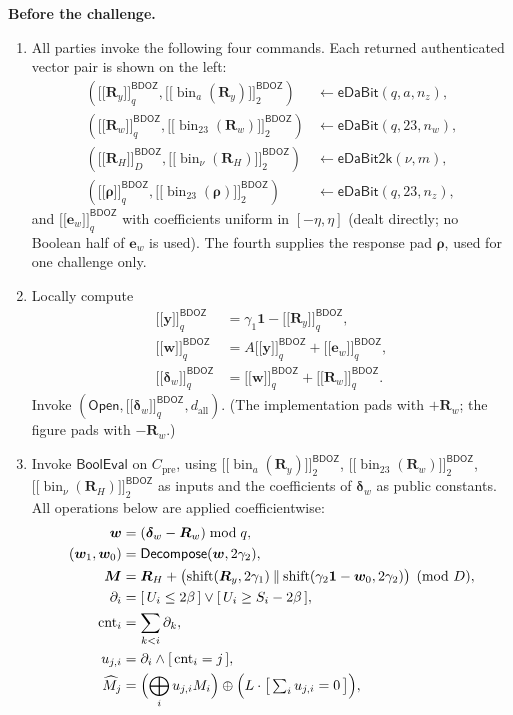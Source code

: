 \documentclass[10pt,letterpaper]{article}
\newcommand{\typedshare}[3]{\mathopen{[\![}#1\mathclose{]\!]}_{#2}^{\mathsf{#3}}}
\newcommand{\sh}[2]{\typedshare{#1}{#2}{BDOZ}}
\newcommand{\vct}[1]{\bm{#1}}
\newcommand{\one}{\mathbf{1}}
\newcommand{\bin}{\operatorname{bin}}
\newcommand{\shift}{\operatorname{shift}}
\newcommand{\cnt}{\operatorname{cnt}}
\newcommand{\Open}{\mathsf{Open}}
\newcommand{\BoolEval}{\mathsf{BoolEval}}
\newcommand{\pre}{C_{\mathrm{pre}}}
\newcommand{\dall}{d_{\mathrm{all}}}
\begin{document}
\begin{mdframed}[style=protocol]
\textbf{Before the challenge.}
\begin{enumerate}
\item All parties invoke the following four commands. Each returned authenticated
vector pair is shown on the left:
\begin{align*}
(\sh{\vct{R}_y}{q},\sh{\bin_a(\vct{R}_y)}{2})
 &\leftarrow \mathsf{eDaBit}(q,a,n_z),\\
(\sh{\vct{R}_w}{q},\sh{\bin_{23}(\vct{R}_w)}{2})
 &\leftarrow \mathsf{eDaBit}(q,23,n_w),\\
(\sh{\vct{R}_H}{D},\sh{\bin_\nu(\vct{R}_H)}{2})
 &\leftarrow \mathsf{eDaBit2k}(\nu,m),\\
(\sh{\vct{\rho}}{q},\sh{\bin_{23}(\vct{\rho})}{2})
 &\leftarrow \mathsf{eDaBit}(q,23,n_z),
\end{align*}
and $\sh{\vct{e}_w}{q}$ with coefficients uniform in $[-\eta,\eta]$
(dealt directly; no Boolean half of $\vct{e}_w$ is used).
The fourth supplies the response pad $\vct{\rho}$, used for one challenge only.
\item Locally compute
\begin{align*}
\sh{\vct{y}}{q}&=\gamma_1\one-\sh{\vct{R}_y}{q},\\
\sh{\vct{w}}{q}&=A\sh{\vct{y}}{q}+\sh{\vct{e}_w}{q},\\
\sh{\vct{\delta}_w}{q}&=\sh{\vct{w}}{q}+\sh{\vct{R}_w}{q}.
\end{align*}
Invoke $(\Open,\sh{\vct{\delta}_w}{q},\dall)$.
(The implementation pads with $+\vct{R}_w$; the figure pads with $-\vct{R}_w$.)
\item Invoke $\BoolEval$ on $\pre$, using
$\sh{\bin_a(\vct{R}_y)}{2}$, $\sh{\bin_{23}(\vct{R}_w)}{2}$, $\sh{\bin_\nu(\vct{R}_H)}{2}$
as inputs and the coefficients of $\vct{\delta}_w$ as public constants.
All operations below are applied coefficientwise:
\begin{align*}
\vct{w}&=(\vct{\delta}_w-\vct{R}_w)\bmod q,\\
(\vct{w}_1,\vct{w}_0)&=\mathsf{Decompose}(\vct{w},2\gamma_2),\\
\vct{M}&=\vct{R}_H+\bigl(\shift(\vct{R}_y,2\gamma_1)
 \mathbin\Vert\shift(\gamma_2\one-\vct{w}_0,2\gamma_2)\bigr)\pmod D,\\
\partial_i&=[\,U_i\leq2\beta\,]\lor[\,U_i\geq S_i-2\beta\,],\\
\cnt_i&=\sum_{k<i}\partial_k,\\
u_{j,i}&=\partial_i\land[\,\cnt_i=j\,],\\
\widehat M_j&=\Bigl(\bigoplus_i u_{j,i}M_i\Bigr)
 \oplus\Bigl(L\cdot\bigl[\,\textstyle\sum_i u_{j,i}=0\,\bigr]\Bigr),\\

\end{align*}
\end{enumerate}
\end{mdframed}
\end{document}
